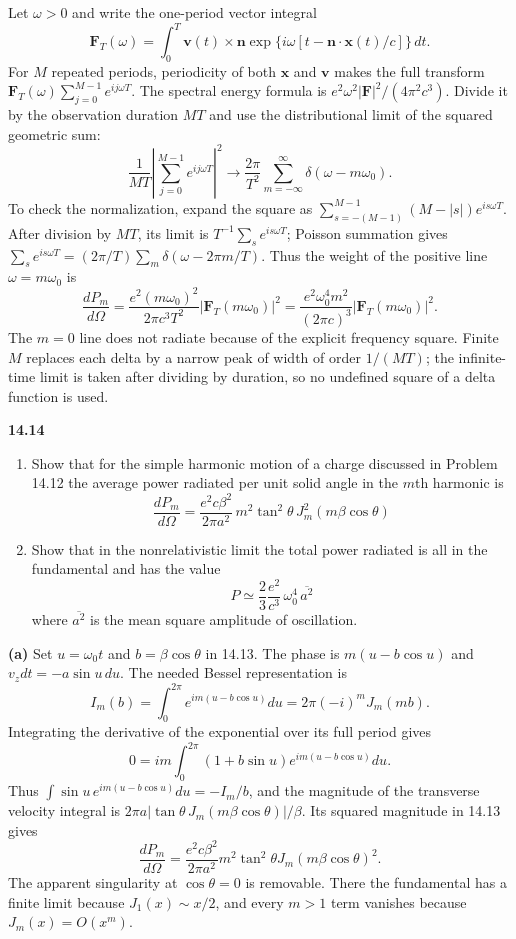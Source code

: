 Let $\omega>0$ and write the one-period vector integral
\[
\mathbf F_T(\omega)=\int_0^T\mathbf v(t)\times\mathbf n
\exp\{i\omega[t-\mathbf n\cdot\mathbf x(t)/c]\}\,dt.
\]
For $M$ repeated periods, periodicity of both $\mathbf x$ and $\mathbf v$
makes the full transform
$\mathbf F_T(\omega)\sum_{j=0}^{M-1}e^{ij\omega T}$.
The spectral energy formula is
$e^2\omega^2|\mathbf F|^2/(4\pi^2c^3)$.
Divide it by the observation duration $MT$ and use the distributional
limit of the squared geometric sum:
\[
\frac1{MT}\left|\sum_{j=0}^{M-1}e^{ij\omega T}\right|^2
\longrightarrow\frac{2\pi}{T^2}
\sum_{m=-\infty}^{\infty}\delta(\omega-m\omega_0).
\]
To check the normalization, expand the square as
$\sum_{s=-(M-1)}^{M-1}(M-|s|)e^{is\omega T}$.
After division by $MT$, its limit is
$T^{-1}\sum_s e^{is\omega T}$; Poisson summation gives
$\sum_s e^{is\omega T}=(2\pi/T)\sum_m\delta(\omega-2\pi m/T)$.
Thus the weight of the positive line $\omega=m\omega_0$ is
\[
\boxed{\frac{dP_m}{d\Omega}
=\frac{e^2(m\omega_0)^2}{2\pi c^3T^2}
|\mathbf F_T(m\omega_0)|^2
=\frac{e^2\omega_0^4m^2}{(2\pi c)^3}
|\mathbf F_T(m\omega_0)|^2.}
\]
The $m=0$ line does not radiate because of the explicit frequency square.
Finite $M$ replaces each delta by a narrow peak of width of order
$1/(MT)$; the infinite-time limit is taken after dividing by duration,
so no undefined square of a delta function is used.

\par\bigskip
\noindent\textbf{14.14}\quad\begin{enumerate}
\item[(a)] Show that for the simple harmonic motion of a charge discussed in Problem 14.12 the average power radiated per unit solid angle in the $m$th harmonic is
\[
\frac{dP_{m}}{d\Omega}=\frac{e^{2}c\beta^{2}}{2\pi a^{2}}\,m^{2}\tan^{2}\theta\,J_{m}^{2}(m\beta\cos\theta)
\]
\item[(b)] Show that in the nonrelativistic limit the total power radiated is all in the fundamental and has the value
\[
P\simeq\frac{2}{3}\frac{e^{2}}{c^{3}}\,\omega_{0}^{4}\,\overline{a^{2}}
\]
where $\overline{a^{2}}$ is the mean square amplitude of oscillation.
\end{enumerate}
\solution

\textbf{(a)} Set $u=\omega_0t$ and $b=\beta\cos\theta$ in 14.13.
The phase is $m(u-b\cos u)$ and $v_zdt=-a\sin u\,du$.
The needed Bessel representation is
\[
I_m(b)=\int_0^{2\pi}e^{im(u-b\cos u)}du
=2\pi(-i)^mJ_m(mb).
\]
Integrating the derivative of the exponential over its full period gives
\[
0=im\int_0^{2\pi}(1+b\sin u)e^{im(u-b\cos u)}du.
\]
Thus $\int\sin u\,e^{im(u-b\cos u)}du=-I_m/b$, and the magnitude of
the transverse velocity integral is
$2\pi a|\tan\theta\,J_m(m\beta\cos\theta)|/\beta$.
Its squared magnitude in 14.13 gives
\[
\boxed{\frac{dP_m}{d\Omega}
=\frac{e^2c\beta^2}{2\pi a^2}
 m^2\tan^2\theta J_m(m\beta\cos\theta)^2.}
\]
The apparent singularity at $\cos\theta=0$ is removable. There the
fundamental has a finite limit because $J_1(x)\sim x/2$, and every
$m>1$ term vanishes because $J_m(x)=O(x^m)$.

